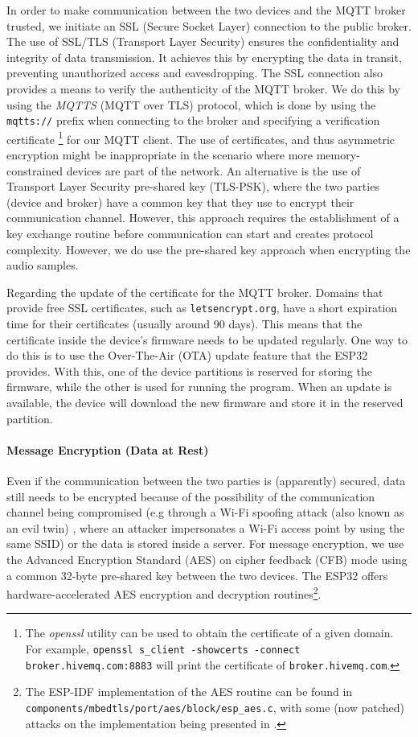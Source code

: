 \documentclass[conference]{IEEEtran}
\begin{document}
In order to make communication between the two devices and the MQTT broker
trusted, we initiate an SSL (Secure Socket Layer) connection to the public broker. 
The use of SSL/TLS (Transport Layer Security)
ensures the confidentiality and integrity of data transmission. 
It achieves this by encrypting the data in transit, preventing
unauthorized access and eavesdropping. The SSL connection also provides a means
to verify the authenticity of the MQTT broker.
We do this by using the \textit{MQTTS} (MQTT over TLS) protocol, which is done 
by using the \texttt{mqtts://} prefix when connecting to the broker and specifying 
a verification certificate
\footnote{The \textit{openssl} utility can be used to obtain the certificate of a given domain.
For example, \texttt{openssl s\_client -showcerts -connect broker.hivemq.com:8883} will print the certificate of \texttt{broker.hivemq.com}.}
for our MQTT client.
The use of certificates, and thus asymmetric encryption might be inappropriate in the scenario where more 
memory-constrained devices are part of the network. 
An alternative is the use of Transport Layer Security pre-shared key (TLS-PSK)\cite{rfc4279}, where the two parties 
(device and broker) have a common key that they use to encrypt their communication channel.
However, this approach requires the establishment of a key exchange routine before communication can start
and creates protocol complexity.
However, we do use the pre-shared key approach when encrypting the audio samples.

Regarding the update of the certificate for the MQTT broker.
Domains that provide free SSL certificates, such as \texttt{letsencrypt.org}, have a short expiration time for their certificates (usually around 90 days).
This means that the certificate inside the device's firmware needs to be updated regularly.
One way to do this is to use the Over-The-Air (OTA) update feature that the ESP32 provides.
With this, one of the device partitions is reserved for storing the firmware, while the other is used for running the program.
When an update is available, the device will download the new firmware and store it in the reserved partition.

\paragraph{Message Encryption (Data at Rest)}
\label{par:message_encryption}

Even if the communication between the two parties is (apparently) secured, data still needs to be encrypted because of the possibility 
of the communication channel being compromised (e.g through a Wi-Fi spoofing attack (also known as an evil twin) \cite{WifiSpoofing}, where an attacker 
impersonates a Wi-Fi access point by using the same SSID) or the data is stored inside a server.
For message encryption, we use the Advanced Encryption Standard (AES) on cipher feedback (CFB) mode using 
a common 32-byte pre-shared key between the two devices.
The ESP32 offers hardware-accelerated AES encryption and decryption routines\footnote{The ESP-IDF implementation of the AES routine can be found in \texttt{components/mbedtls/port/aes/block/esp\_aes.c},
with some (now patched) attacks on the implementation being presented in \cite{PwnEsp32Crypto}.}.
\end{document}
